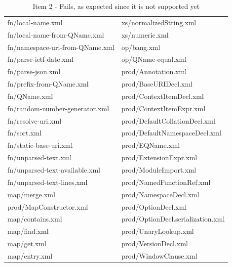 \begin{table}
\begin{tabular}{|l|l|}
		fn/local-name.xml               & xs/normalizedString.xml            \\
		fn/local-name-from-QName.xml    & xs/numeric.xml                     \\
		fn/namespace-uri-from-QName.xml & op/bang.xml                        \\
		fn/parse-ietf-date.xml          & op/QName-equal.xml                 \\
		fn/parse-json.xml               & prod/Annotation.xml                \\
		fn/prefix-from-QName.xml        & prod/BaseURIDecl.xml               \\
		fn/QName.xml                    & prod/ContextItemDecl.xml           \\
		fn/random-number-generator.xml  & prod/ContextItemExpr.xml           \\
		fn/resolve-uri.xml              & prod/DefaultCollationDecl.xml      \\
		fn/sort.xml                     & prod/DefaultNamespaceDecl.xml      \\
		fn/static-base-uri.xml          & prod/EQName.xml                    \\
		fn/unparsed-text.xml            & prod/ExtensionExpr.xml             \\
		fn/unparsed-text-available.xml  & prod/ModuleImport.xml              \\
		fn/unparsed-text-lines.xml      & prod/NamedFunctionRef.xml          \\
		map/merge.xml                   & prod/NamespaceDecl.xml             \\
		prod/MapConstructor.xml         & prod/OptionDecl.xml                \\
		map/contains.xml                & prod/OptionDecl.serialization.xml  \\
		map/find.xml                    & prod/UnaryLookup.xml               \\
		map/get.xml                     & prod/VersionDecl.xml               \\
		map/entry.xml                   & prod/WindowClause.xml              \\
		\hline
	\end{tabular}
	\caption{Item 2 - Fails, as expected since it is not supported yet}
	\label{tab:Phase3_Item2}
\end{table}

